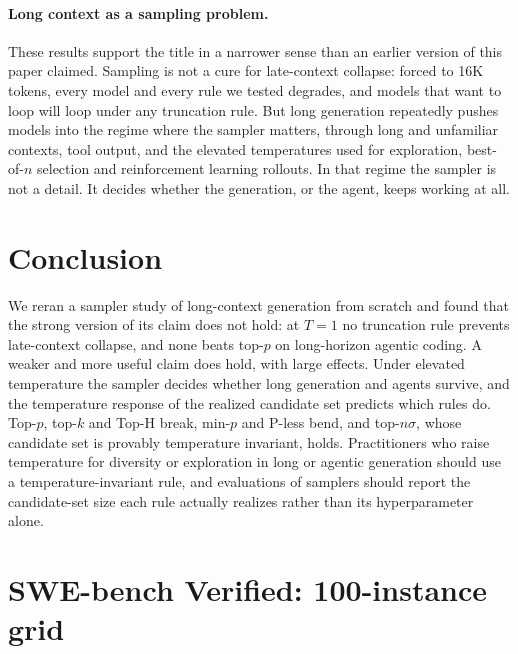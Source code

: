 \documentclass{article}
\newcommand{\pless}{P-less}
\begin{document}
\paragraph{Long context as a sampling problem.}
These results support the title in a narrower sense than an earlier version of this paper claimed. Sampling is not a cure for late-context collapse: forced to 16K tokens, every model and every rule we tested degrades, and models that want to loop will loop under any truncation rule. But long generation repeatedly pushes models into the regime where the sampler matters, through long and unfamiliar contexts, tool output, and the elevated temperatures used for exploration, best-of-$n$ selection and reinforcement learning rollouts. In that regime the sampler is not a detail. It decides whether the generation, or the agent, keeps working at all.

\section{Conclusion}
\label{sec:conclusion}

We reran a sampler study of long-context generation from scratch and found that the strong version of its claim does not hold: at $T{=}1$ no truncation rule prevents late-context collapse, and none beats top-$p$ on long-horizon agentic coding. A weaker and more useful claim does hold, with large effects. Under elevated temperature the sampler decides whether long generation and agents survive, and the temperature response of the realized candidate set predicts which rules do. Top-$p$, top-$k$ and Top-H break, min-$p$ and \pless{} bend, and top-$n\sigma$, whose candidate set is provably temperature invariant, holds. Practitioners who raise temperature for diversity or exploration in long or agentic generation should use a temperature-invariant rule, and evaluations of samplers should report the candidate-set size each rule actually realizes rather than its hyperparameter alone.





\newpage
\appendix

\section{SWE-bench Verified: 100-instance grid}
\label{app:swe}
\end{document}
